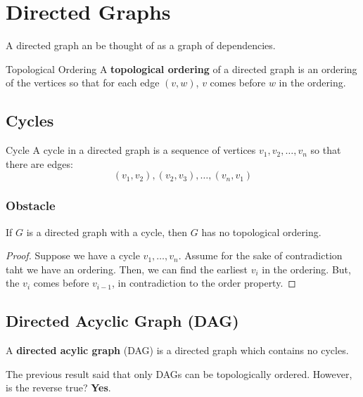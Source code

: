 \documentclass[letterpaper]{article}
\begin{document}
\section{Directed Graphs}
A directed graph an be thought of as a graph of dependencies. 

\begin{definition}{Topological Ordering}{}
    A \textbf{topological ordering} of a directed graph is an ordering of the vertices so that for each edge $(v, w)$, $v$ comes before $w$ in the ordering.
\end{definition}

\subsection{Cycles}
\begin{definition}{Cycle}{}
    A cycle in a directed graph is a sequence of vertices $v_1, v_2, \dots, v_n$ so that there are edges: 
    \[(v_1, v_2), (v_2, v_3), \dots, (v_n, v_1)\]
\end{definition}

\subsubsection{Obstacle}
\begin{proposition}
    If $G$ is a directed graph with a cycle, then $G$ has no topological ordering.
\end{proposition}

\begin{mdframed}[]
    \begin{proof}
        Suppose we have a cycle $v_1, \dots, v_n$. Assume for the sake of contradiction taht we have an ordering. Then, we can find the earliest $v_i$ in the ordering. But, the $v_i$ comes before $v_{i - 1}$, in contradiction to the order property. 
    \end{proof}
\end{mdframed}

\subsection{Directed Acyclic Graph (DAG)}
\begin{definition}{}{}
    A \textbf{directed acylic graph} (DAG) is a directed graph which contains no cycles. 
\end{definition}

The previous result said that only DAGs can be topologically ordered. However, is the reverse true? \textbf{Yes}. 
\end{document}
